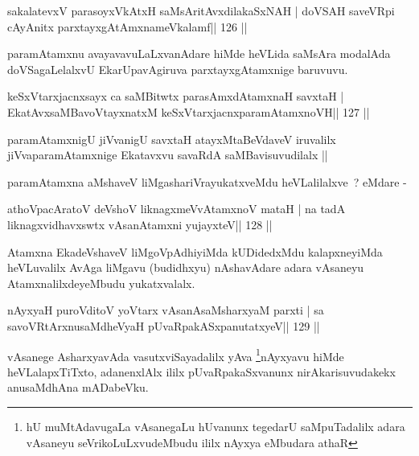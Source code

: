
\begin{shl}
sakalatevxV parasoyxVkAtxH saMsAritAvxdilakaSxNAH |
doVSAH saveVR\s pi cA\s\s yAnitx parxtayxgAtAmxnameVkalamf\hfill || 126 ||
\end{shl}

\begin{artha}
paramAtamxnu avayavavuLaLxvanAdare hiMde heVLida saMsAra modalAda
doVSagaLelalxvU EkarUpavAgiruva parxtayxgAtamxnige baruvuvu.
\end{artha}

\begin{shl}
keSxVtarxjacnxsayx ca saMBitwtx parasAmxdAtamxnaH savxtaH |
EkatAvxsaMBavoV\s tayxnatxM keSxVtarxjacnxparamAtamxnoVH\hfill || 127 ||
\end{shl}

\begin{artha}
paramAtamxnigU jiVvanigU savxtaH atayxMtaBeVdaveV iruvalilx
jiVvaparamAtamxnige Ekatavxvu savaRdA saMBavisuvudilalx ||

paramAtamxna aMshaveV liMgashariVrayukatxveMdu heVLalilalxve~? eMdare -
\end{artha}

\begin{shl}
athoVpacAratoV deVshoV liknagxmeVvA\s\s tamxnoV mataH |
na tadA liknagxvidhavxswtx vAsanA\s\s tamxni yujayxteV\hfill || 128 ||
\end{shl}

\begin{artha}
Atamxna EkadeVshaveV liMgoVpAdhiyiMda kUDidedxMdu kalapxneyiMda heVLuvalilx AvAga liMgavu (budidhxyu) nAshavAdare adara vAsaneyu AtamxnalilxdeyeMbudu yukatxvalalx.
\end{artha}

\begin{shl}
nAyxyaH puroVditoV yoV\s tarx vAsanAsaMsharxyaM parxti |
sa savoVR\s tArxnusaMdheVyaH pUvaRpakASxpanutatxyeV\hfill || 129 ||
\end{shl}

\begin{artha}
vAsanege AsharxyavAda vasutxviSayadalilx yAva \footnote{hU   muMtAdavugaLa vAsanegaLu hUvanunx tegedarU saMpuTadalilx   adara vAsaneyu seVrikoLuLxvudeMbudu ililx nAyxya eMbudara athaR}nAyxyavu hiMde heVLalapxTiTxto, adanenxlAlx ililx pUvaRpakaSxvanunx nirAkarisuvudakekx anusaMdhAna mADabeVku.
\end{artha}


